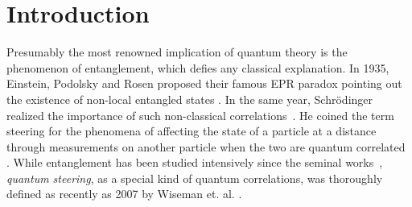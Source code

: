 \documentclass[aps,pra,twocolumn,superscriptaddress,showemail,showpacs,longbibliography]{revtex4-2}
\begin{document}
\maketitle


\section{Introduction}
Presumably the most renowned implication of quantum theory is the phenomenon of entanglement, which defies any classical explanation. In 1935, Einstein, Podolsky and Rosen proposed their famous EPR paradox pointing out the existence of non-local entangled states \cite{EinsteinCan-Quantum-Mechanical-Description-of-Physical1935}. 
In the same year, Schrödinger realized the importance of such non-classical correlations~\cite{SchrodingerDiscussion-of-Probability-Relations1935}. He coined the term steering for the phenomena of affecting the state of a particle at a distance through measurements on another particle when the two are quantum correlated  \cite{SchrodingerDiscussion-of-Probability-Relations1935}. 
While entanglement has been studied intensively since the seminal works~\cite{EinsteinCan-Quantum-Mechanical-Description-of-Physical1935,SchrodingerDiscussion-of-Probability-Relations1935}, \emph{quantum steering}, as a special kind of quantum correlations, was thoroughly defined as recently as 2007 by Wiseman et. al. \cite{wisemanSteeringEntanglementNonlocality2007, jonesEntanglementEinsteinPodolskyRosenCorrelations2007}.
\end{document}
